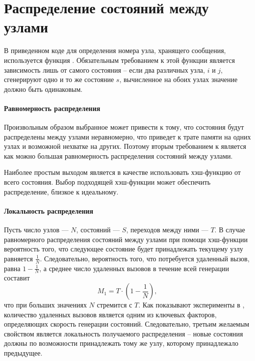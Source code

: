 \section{Распределение состояний между узлами}
\label{sec:state-partition}

В приведенном коде для определения номера узла, хранящего сообщения, используется функция
. Обязательным требованием к этой функции является зависимость лишь от
самого состояния -- если два различных узла, $i$ и $j$, сгенерируют одно и то же состояние
$s$, вычисленное на обоих узлах значение  должно быть одинаковым.

\paragraph{Равномерность распределения}
\label{sec:partition-homogenity}

Произвольным образом выбранное  может привести к тому, что состояния будут
распределены между узлами неравномерно, что приведет к трате памяти на одних узлах и
возможной нехватке на других. Поэтому вторым требованием к  является как
можно большая равномерность распределения состояний между узлами. 

Наиболее простым выходом является в качестве  использовать хэш-функцию от
всего состояния. Выбор подходящей хэш-функции может обеспечить распределение, близкое к
идеальному.

\paragraph{Локальность распределения}
\label{sec:partition-locality}

Пусть число узлов — $N$, состояний — $S$, переходов между ними — $T$. В случае
равномерного распределения состояний между узлами при помощи хэш-функции вероятность того,
что следующее состояние будет принадлежать текущему узлу равняется
$\frac{1}{N}$. Следовательно, вероятность того, что потребуется удаленный вызов, равна $1
- \frac{1}{N}$, а среднее число удаленных вызовов в течение всей генерации составит
\begin{equation}
  \label{eq:nmsg-full-hash}
  M_1 = T \cdot (1 - \frac{1}{N}) ,
\end{equation}
что при больших значениях $N$ стремится с $T$. Как показывают эксперименты в \cite{LS99},
количество удаленных вызовов является одним из ключевых факторов, определяющих скорость
генерации состояний. Следовательно, третьим желаемым свойством  является
локальность получаемого распределения -- новые состояния должны по возможности
принадлежать тому же узлу, которому принадлежало предыдущее.

